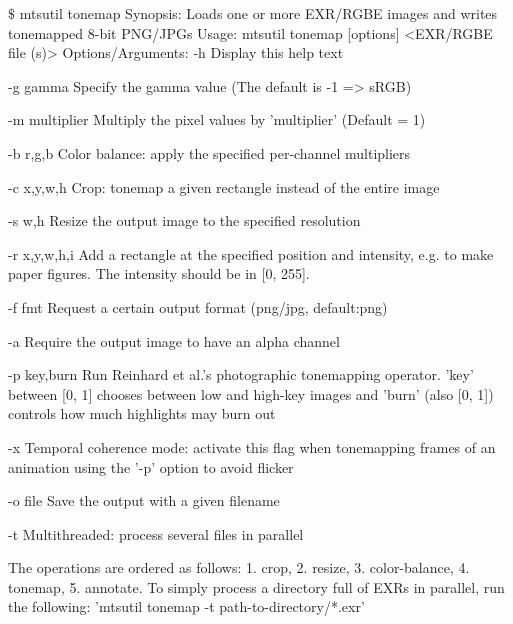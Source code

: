 \begin{console}[label=lst:tonemap-cli,caption=Command line options of the \texttt{mtsutil tonemap} utility]
$\texttt{\$}$ mtsutil tonemap
Synopsis: Loads one or more EXR/RGBE images and writes tonemapped 8-bit PNG/JPGs
Usage: mtsutil tonemap [options] <EXR/RGBE file (s)>
Options/Arguments:
   -h             Display this help text

   -g gamma       Specify the gamma value (The default is -1 => sRGB)

   -m multiplier  Multiply the pixel values by 'multiplier' (Default = 1)

   -b r,g,b       Color balance: apply the specified per-channel multipliers

   -c x,y,w,h     Crop: tonemap a given rectangle instead of the entire image

   -s w,h         Resize the output image to the specified resolution

   -r x,y,w,h,i   Add a rectangle at the specified position and intensity, e.g.
                  to make paper figures. The intensity should be in [0, 255].

   -f fmt         Request a certain output format (png/jpg, default:png)

   -a             Require the output image to have an alpha channel

   -p key,burn    Run Reinhard et al.'s photographic tonemapping operator. 'key'
                  between [0, 1] chooses between low and high-key images and
                  'burn' (also [0, 1]) controls how much highlights may burn out

   -x             Temporal coherence mode: activate this flag when tonemapping
                  frames of an animation using the '-p' option to avoid flicker

   -o file        Save the output with a given filename

   -t             Multithreaded: process several files in parallel

 The operations are ordered as follows: 1. crop, 2. resize, 3. color-balance,
 4. tonemap, 5. annotate. To simply process a directory full of EXRs in
 parallel, run the following: 'mtsutil tonemap -t path-to-directory/*.exr'
\end{console}
